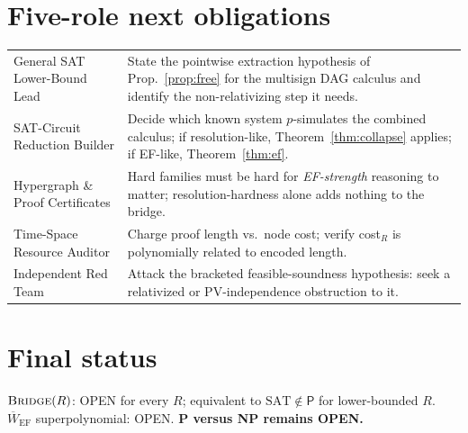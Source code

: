 \documentclass[11pt]{article}
\newcommand{\SAT}{\mathrm{SAT}}
\newcommand{\Pclass}{\mathsf{P}}
\begin{document}
\section*{Five-role next obligations}
\begin{tabular}{p{}p{}}
General SAT Lower-Bound Lead & State the pointwise extraction hypothesis of Prop.~\ref{prop:free} for the multisign DAG calculus and identify the non-relativizing step it needs.\\
SAT-Circuit Reduction Builder & Decide which known system $p$-simulates the combined calculus; if resolution-like, Theorem~\ref{thm:collapse} applies; if EF-like, Theorem~\ref{thm:ef}.\\
Hypergraph \& Proof Certificates & Hard families must be hard for \emph{EF-strength} reasoning to matter; resolution-hardness alone adds nothing to the bridge.\\
Time-Space Resource Auditor & Charge proof length vs.\ node cost; verify cost$_R$ is polynomially related to encoded length.\\
Independent Red Team & Attack the bracketed feasible-soundness hypothesis: seek a relativized or PV-independence obstruction to it.
\end{tabular}

\section*{Final status}
$\textsc{Bridge}(R)$: OPEN for every $R$; equivalent to $\SAT\notin\Pclass$ for lower-bounded $R$.
$\overline W_{\mathrm{EF}}$ superpolynomial: OPEN. \textbf{P versus NP remains OPEN.}
\end{document}
